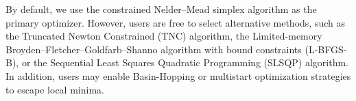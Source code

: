 \documentclass[extra,mreferee]{gji}
\theoremstyle{lemma}
\begin{document}
By default, we use the constrained Nelder–Mead simplex algorithm as the primary optimizer. However, users are free to select alternative methods, such as the Truncated Newton Constrained (TNC) algorithm, the Limited-memory Broyden–Fletcher–Goldfarb–Shanno algorithm with bound constraints (L-BFGS-B), or the Sequential Least Squares Quadratic Programming (SLSQP) algorithm. In addition, users may enable Basin-Hopping or multistart optimization strategies to escape local minima.



\end{document}
